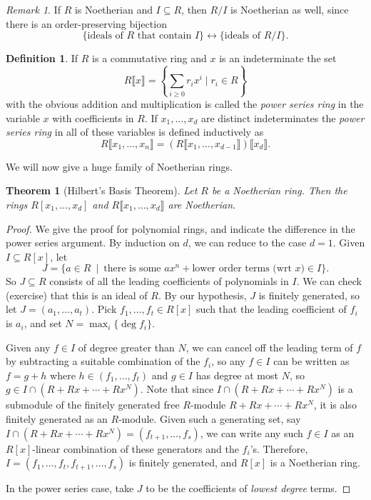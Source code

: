 \documentclass{amsart}[12pt]
\newcommand{\DEF}[1]{\emph{#1}\index{#1}}
\numberwithin{equation}{section}
\theoremstyle{plain} %
\newtheorem{theorem}[equation]{Theorem}
\theoremstyle{definition}
\newtheorem{defn}[equation]{Definition}
\theoremstyle{remark}
\newtheorem{rem}[equation]{Remark}
\begin{document}
\begin{rem} If $R$ is Noetherian and $I\subseteq R$, then $R/I$ is Noetherian as well, since there is an order-preserving bijection
\[ \{ \text{ideals of } R \text{ that contain } I \} \leftrightarrow \{\text{ideals of }R/I\}. \]
\end{rem}

\begin{defn}
If $R$ is a commutative ring and $x$ is an indeterminate the set 
\[R\llbracket x \rrbracket=\left\{\sum_{i\geq 0} r_i x^i \mid r_i\in R\right\}\]
with the obvious addition and multiplication
is called the {\em power series ring} in the variable $x$ with coefficients in $R$. If $x_1,\ldots, x_d$ are distinct indeterminates the \DEF{power series ring} in all of these variables is defined inductively as 
\[R\llbracket x_1,\ldots,x_n \rrbracket=\left(R\llbracket x_1,\ldots,x_{d-1}\rrbracket \right)\llbracket x_d\rrbracket.\]
\end{defn}






We will now give a huge family of Noetherian rings.



\begin{theorem}[Hilbert's Basis Theorem]
	Let $R$ be a Noetherian ring. Then the rings $R[x_1,\dots,x_d]$ and $R\llbracket x_1,\dots,x_d\rrbracket$ are Noetherian.
\end{theorem}

\begin{proof}
	We give the proof for polynomial rings, and indicate the difference in the power series argument. By induction on $d$, we can reduce to the case $d=1$. Given $I\subseteq R[x]$, let 
	\[ J = \{ a \in R \ \mid  \ \textrm{there is some } a x^n + \text{lower order terms (wrt }x) \in I\}.\]
	So $J \subseteq R$ consists of all the leading coefficients of polynomials in $I$. We can check (exercise) that this is an ideal of $R$. By our hypothesis, $J$ is finitely generated, so let $J = (a_1,\dots,a_t)$. Pick $f_1,\dots,f_t\in R[x]$ such that the leading coefficient of $f_i$ is $a_i$, and set $N=\displaystyle\max_i \{\deg{f_i} \}$.
	
	Given any $f\in I$ of degree greater than $N$, we can cancel off the leading term of $f$ by subtracting a suitable combination of the $f_i$, so any $f \in I$ can be written as $f = g+h$ where $h\in (f_1, \ldots, f_t)$ and $g \in I$ has degree at most $N$, so $g \in I \cap (R + Rx + \cdots + R x^N)$. Note that since $I \cap (R + Rx + \cdots + R x^N)$ is a submodule of the finitely generated free $R$-module $R + Rx + \cdots + R x^N$, it is also finitely generated as an $R$-module. Given such a generating set, say $I \cap (R + Rx + \cdots + Rx^N) = (f_{t+1}, \ldots, f_s)$, we can write any such $f \in I$ as an $R[x]$-linear combination of these generators and the $f_i$'s. Therefore, $I = (f_1, \ldots, f_t, f_{t+1}, \ldots, f_s)$ is finitely generated, and $R[x]$ is a Noetherian ring.
	
	In the power series case, take $J$ to be the coefficients of \emph{lowest degree} terms.
\end{proof}
\end{document}

